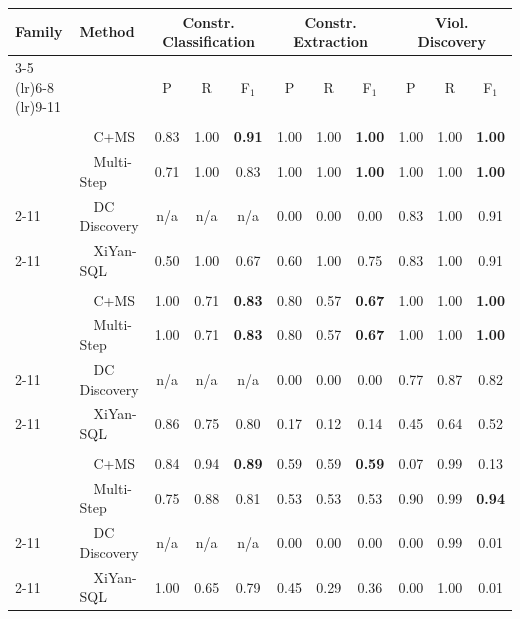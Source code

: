 \begin{tabular}{llccccccccc}
\toprule
\textbf{Family} & \textbf{Method} & \multicolumn{3}{c}{Constr. Classification} & \multicolumn{3}{c}{Constr. Extraction} & \multicolumn{3}{c}{Viol. Discovery} \\
\cmidrule(lr){3-5}  \cmidrule(lr){6-8}  \cmidrule(lr){9-11}
 &  & P & R & F$_1$ & P & R & F$_1$ & P & R & F$_1$ \\
\midrule
\addlinespace[2pt]
\multicolumn{11}{c}{\textbf{Hospital}} \\
\addlinespace[1pt]
\multirow{2}{*}{\system} & ~~C+MS & 0.83 & 1.00 & \textbf{0.91} & 1.00 & 1.00 & \textbf{1.00} & 1.00 & 1.00 & \textbf{1.00} \\
 & ~~Multi-Step & 0.71 & 1.00 & 0.83 & 1.00 & 1.00 & \textbf{1.00} & 1.00 & 1.00 & \textbf{1.00} \\
\cmidrule(l){2-11}
\multirow{1}{*}{Profiling} & ~~DC Discovery & n/a & n/a & n/a & 0.00 & 0.00 & 0.00 & 0.83 & 1.00 & 0.91 \\
\cmidrule(l){2-11}
\multirow{1}{*}{Text2SQL} & ~~XiYan-SQL & 0.50 & 1.00 & 0.67 & 0.60 & 1.00 & 0.75 & 0.83 & 1.00 & 0.91 \\
\midrule
\addlinespace[2pt]
\multicolumn{11}{c}{\textbf{Restaurant}} \\
\addlinespace[1pt]
\multirow{2}{*}{\system} & ~~C+MS & 1.00 & 0.71 & \textbf{0.83} & 0.80 & 0.57 & \textbf{0.67} & 1.00 & 1.00 & \textbf{1.00} \\
 & ~~Multi-Step & 1.00 & 0.71 & \textbf{0.83} & 0.80 & 0.57 & \textbf{0.67} & 1.00 & 1.00 & \textbf{1.00} \\
\cmidrule(l){2-11}
\multirow{1}{*}{Profiling} & ~~DC Discovery & n/a & n/a & n/a & 0.00 & 0.00 & 0.00 & 0.77 & 0.87 & 0.82 \\
\cmidrule(l){2-11}
\multirow{1}{*}{Text2SQL} & ~~XiYan-SQL & 0.86 & 0.75 & 0.80 & 0.17 & 0.12 & 0.14 & 0.45 & 0.64 & 0.52 \\
\midrule
\addlinespace[2pt]
\multicolumn{11}{c}{\textbf{SISU}} \\
\addlinespace[1pt]
\multirow{2}{*}{\system} & ~~C+MS & 0.84 & 0.94 & \textbf{0.89} & 0.59 & 0.59 & \textbf{0.59} & 0.07 & 0.99 & 0.13 \\
 & ~~Multi-Step & 0.75 & 0.88 & 0.81 & 0.53 & 0.53 & 0.53 & 0.90 & 0.99 & \textbf{0.94} \\
\cmidrule(l){2-11}
\multirow{1}{*}{Profiling} & ~~DC Discovery & n/a & n/a & n/a & 0.00 & 0.00 & 0.00 & 0.00 & 0.99 & 0.01 \\
\cmidrule(l){2-11}
\multirow{1}{*}{Text2SQL} & ~~XiYan-SQL & 1.00 & 0.65 & 0.79 & 0.45 & 0.29 & 0.36 & 0.00 & 1.00 & 0.01 \\

\end{tabular}
